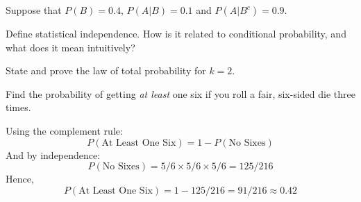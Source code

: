 \documentclass[addpoints,12pt]{exam}
\begin{document}
\begin{questions}

\question Suppose that $P(B) = 0.4$, $P(A|B) = 0.1$ and $P(A|B^c) = 0.9$. 

\question Define statistical independence. How is it related to conditional probability, and what does it mean intuitively?

\question State and prove the law of total probability for $k = 2$.

\question Find the probability of getting \emph{at least} one six if you roll a fair, six-sided die three times.
		\begin{solution}
			Using the complement rule:
				$$P(\mbox{At Least One Six}) = 1 - P(\mbox{No Sixes})$$
			And by independence:
				$$P(\mbox{No Sixes}) = 5/6 \times 5/6 \times 5/6 = 125/216$$
			Hence, 
			$$P(\mbox{At Least One Six}) = 1 - 125/216 = 91/216 \approx 0.42$$
		\end{solution}
	

\end{questions}
\end{document}
